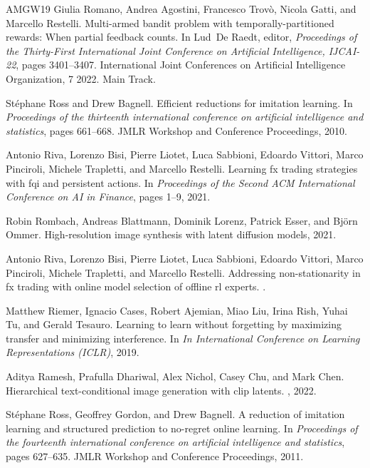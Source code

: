 \begin{thebibliography}{AMGW{\etalchar{+}}19}
Giulia Romano, Andrea Agostini, Francesco Trov{\`o}, Nicola Gatti, and Marcello Restelli.
\newblock Multi-armed bandit problem with temporally-partitioned rewards: When partial feedback counts.
\newblock In Lud~De Raedt, editor, {\em Proceedings of the Thirty-First International Joint Conference on Artificial Intelligence, {IJCAI-22}}, pages 3401--3407. International Joint Conferences on Artificial Intelligence Organization, 7 2022.
\newblock Main Track.

St{\'e}phane Ross and Drew Bagnell.
\newblock Efficient reductions for imitation learning.
\newblock In {\em Proceedings of the thirteenth international conference on artificial intelligence and statistics}, pages 661--668. JMLR Workshop and Conference Proceedings, 2010.

Antonio Riva, Lorenzo Bisi, Pierre Liotet, Luca Sabbioni, Edoardo Vittori, Marco Pinciroli, Michele Trapletti, and Marcello Restelli.
\newblock Learning fx trading strategies with fqi and persistent actions.
\newblock In {\em Proceedings of the Second ACM International Conference on AI in Finance}, pages 1--9, 2021.

Robin Rombach, Andreas Blattmann, Dominik Lorenz, Patrick Esser, and Björn Ommer.
\newblock High-resolution image synthesis with latent diffusion models, 2021.

Antonio Riva, Lorenzo Bisi, Pierre Liotet, Luca Sabbioni, Edoardo Vittori, Marco Pinciroli, Michele Trapletti, and Marcello Restelli.
\newblock Addressing non-stationarity in fx trading with online model selection of offline rl experts.
.

Matthew Riemer, Ignacio Cases, Robert Ajemian, Miao Liu, Irina Rish, Yuhai Tu, and Gerald Tesauro.
\newblock Learning to learn without forgetting by maximizing transfer and minimizing interference.
\newblock In {\em In International Conference on Learning Representations (ICLR)}, 2019.

Aditya Ramesh, Prafulla Dhariwal, Alex Nichol, Casey Chu, and Mark Chen.
\newblock Hierarchical text-conditional image generation with clip latents.
, 2022.

St{\'e}phane Ross, Geoffrey Gordon, and Drew Bagnell.
\newblock A reduction of imitation learning and structured prediction to no-regret online learning.
\newblock In {\em Proceedings of the fourteenth international conference on artificial intelligence and statistics}, pages 627--635. JMLR Workshop and Conference Proceedings, 2011.


\end{thebibliography}
